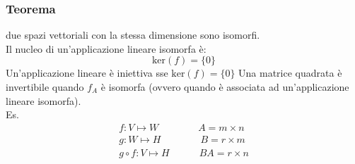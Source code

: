 \documentclass[italian]{article}
\renewcommand{\ker}[1]{\text{ker$\left(#1\right)$}}
\begin{document}
\newpage
\subsubsection{Teorema} due spazi vettoriali con la stessa dimensione sono isomorfi.\\
Il nucleo di un'applicazione lineare isomorfa è: \[ \ker{f} = \{ 0 \} \]
Un'applicazione lineare è iniettiva sse $\ker{f} = \{ 0 \}$
Una matrice quadrata è invertibile quando $f_A$ è isomorfa (ovvero quando è associata ad un'applicazione lineare isomorfa).\\
Es.
\begin{gather*}
	f: V \longmapsto W \qquad\qquad A = m \times n \\
	g: W \longmapsto H \qquad\qquad B = r \times m \\
	g \circ f: V \longmapsto H \qquad\quad BA = r \times n
\end{gather*}
\end{document}
